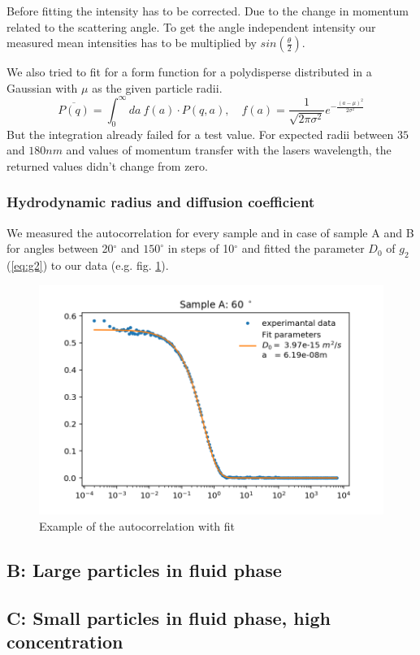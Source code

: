 \documentclass[]{article}
\begin{document}
Before fitting the intensity has to be corrected. Due to the change in momentum related to the scattering angle. To get the angle independent intensity our measured mean intensities has to be multiplied by $sin(\frac{\theta}{2} )$.


We also tried to fit for a form function for a polydisperse distributed in a Gaussian with $\mu$ as the given particle radii. 
\[ \overline{P(q)} = \int_0^\infty da\: f(a)\cdot P(q,a) , \quad f(a)= \frac{1}{\sqrt{2 \pi \sigma^2}} e^{-\frac{(a-\mu)^2}{2 \sigma^2}} \]
But the integration already failed for a test value. For expected radii between $35$ and $180nm$ and values of momentum transfer with the lasers wavelength, the returned values didn't change from zero. 

\subsubsection{Hydrodynamic radius and diffusion coefficient}
We measured the autocorrelation for every sample and in case of sample A and B for angles between 20$^\circ$ and $150^\circ$ in steps of 10$^\circ$ and fitted the parameter $D_0$ of $g_2$ (\ref{eq:g2}) to our data (e.g. fig.  \ref{fig:Sample A 60}). 
\begin{figure}
	\centering
	\includegraphics[width=0.7\linewidth]{Plots/A/60}
	\caption[Autocorrelation with fit of $g_2$]{}
	\caption{Example of the autocorrelation with fit}
	\label{fig:Sample A 60}
\end{figure}



\subsection{B: Large particles in fluid phase}


\subsection{C: Small particles in fluid phase, high concentration}
\end{document}
